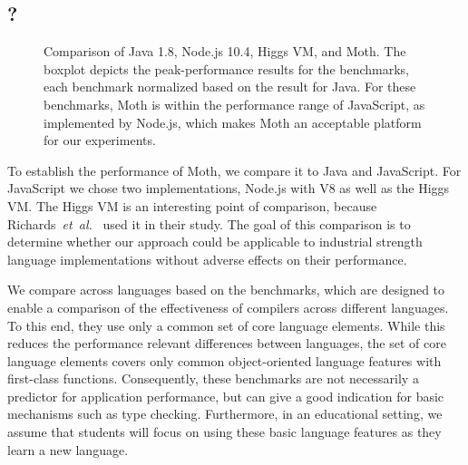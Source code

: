 \subsection{\AWFY?}
\label{sec:baseline-perf}


\begin{figure}
	\AwfyBaseline{}
	\caption{Comparison of Java 1.8, Node.js 10.4, Higgs VM, and Moth.
  The boxplot depicts the peak-performance results for the \AWFY benchmarks,
  each benchmark normalized based on the result for Java.
  For these benchmarks, Moth is within the performance range
  of JavaScript, as implemented by Node.js,
  which makes Moth an acceptable platform for our experiments.}
	\label{fig:awfy-baseline}
\end{figure}

To establish the performance of Moth,
we compare it to Java and JavaScript.
For JavaScript we chose two implementations,
Node.js with V8 as well as the Higgs VM.
The Higgs VM is an interesting point of comparison,
because Richards~\textit{et~al.}~\cite{Richards2017} used it in their study.
The goal of this comparison is to determine whether our approach
could be applicable to industrial strength language implementations
without adverse effects on their performance. 

We compare across languages based on the \AWFY benchmarks\citep{Marr2016},
which are designed to enable a comparison
of the effectiveness of compilers across different languages.
To this end, they use only a common set of core language elements.
While this reduces the performance relevant differences between languages,
the set of core language elements covers only common object-oriented language
features with first-class functions.
Consequently, these benchmarks are not necessarily a predictor
for application performance,
but can give a good indication for basic mechanisms such as type checking.
Furthermore, in an educational setting,
we assume that students will focus on using these basic language features
as they learn a new language.


